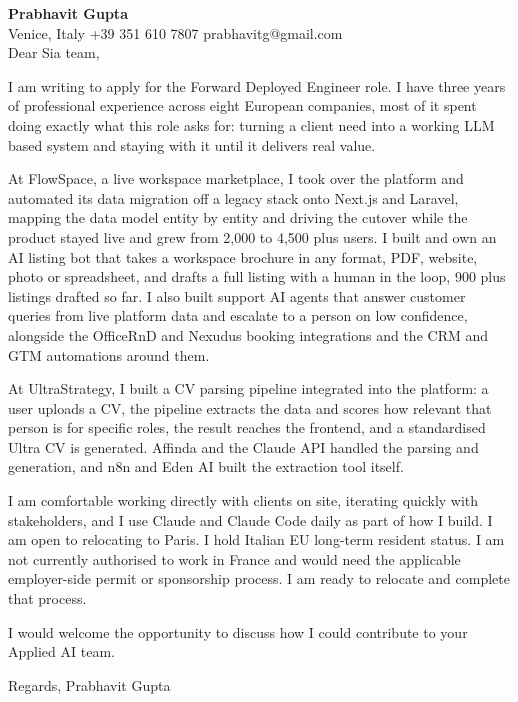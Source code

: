 \documentclass[a4paper,10.5pt]{article}
\begin{document}
\textbf{Prabhavit Gupta}\\
Venice, Italy \textbar{} +39 351 610 7807 \textbar{} prabhavitg@gmail.com\\[10pt]
Dear Sia team,

I am writing to apply for the Forward Deployed Engineer role. I have three years of professional experience across eight European companies, most of it spent doing exactly what this role asks for: turning a client need into a working LLM based system and staying with it until it delivers real value.

At FlowSpace, a live workspace marketplace, I took over the platform and automated its data migration off a legacy stack onto Next.js and Laravel, mapping the data model entity by entity and driving the cutover while the product stayed live and grew from 2,000 to 4,500 plus users. I built and own an AI listing bot that takes a workspace brochure in any format, PDF, website, photo or spreadsheet, and drafts a full listing with a human in the loop, 900 plus listings drafted so far. I also built support AI agents that answer customer queries from live platform data and escalate to a person on low confidence, alongside the OfficeRnD and Nexudus booking integrations and the CRM and GTM automations around them.

At UltraStrategy, I built a CV parsing pipeline integrated into the platform: a user uploads a CV, the pipeline extracts the data and scores how relevant that person is for specific roles, the result reaches the frontend, and a standardised Ultra CV is generated. Affinda and the Claude API handled the parsing and generation, and n8n and Eden AI built the extraction tool itself.

I am comfortable working directly with clients on site, iterating quickly with stakeholders, and I use Claude and Claude Code daily as part of how I build. I am open to relocating to Paris. I hold Italian EU long-term resident status. I am not currently authorised to work in France and would need the applicable employer-side permit or sponsorship process. I am ready to relocate and complete that process.

I would welcome the opportunity to discuss how I could contribute to your Applied AI team.

Regards,
Prabhavit Gupta
\end{document}
